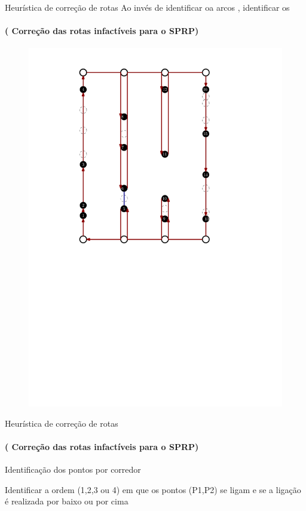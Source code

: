 \documentclass[12pt]{beamer}
\begin{document}
\begin{frame}{Heur\'istica de corre\c{c}\~ao de rotas}
	Ao inv\'es de identificar oa arcos {} , identificar os {} 
	\framesubtitle{( Corre\c{c}\~ao das rotas infact\'iveis para o SPRP)}
	\begin{center}
		\begin{figure}			
			\includegraphics[width=0.5\linewidth]{imagens_correcao/corr-14}
		\end{figure}
	\end{center}
\end{frame}

\begin{frame}{Heur\'istica de corre\c{c}\~ao de rotas}
	\framesubtitle{( Corre\c{c}\~ao das rotas infact\'iveis para o SPRP)}
	\fboxsep=0pt
	\hfill%
	{%
		\begin{minipage}[t]{0.4\linewidth}
			\begin{itemize}
			    {\normalsize 	\item Identifica\c{c}\~ao dos pontos por corredor}
				\pause
				\item Identificar a ordem (1,2,3 ou 4) em que os pontos (P1,P2) se ligam e se a liga\c{c}\~ao \'e realizada por baixo ou por cima
			

			\end{itemize}
		\end{minipage}
	}
\end{frame}
\end{document}
